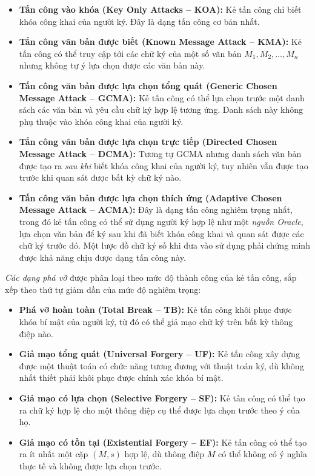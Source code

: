 \begin{itemize}
    \item \textbf{Tấn công vào khóa (Key Only Attacks -- KOA):} Kẻ tấn công chỉ biết khóa công khai của người ký. Đây là dạng tấn công cơ bản nhất.

    \item \textbf{Tấn công văn bản được biết (Known Message Attack -- KMA):} Kẻ tấn công có thể truy cập tới các chữ ký của một số văn bản $M_1, M_2, \dots, M_n$ nhưng không tự ý lựa chọn được các văn bản này.

    \item \textbf{Tấn công văn bản được lựa chọn tổng quát (Generic Chosen Message Attack -- GCMA):} Kẻ tấn công có thể lựa chọn trước một danh sách các văn bản và yêu cầu chữ ký hợp lệ tương ứng. Danh sách này không phụ thuộc vào khóa công khai của người ký.

    \item \textbf{Tấn công văn bản được lựa chọn trực tiếp (Directed Chosen Message Attack -- DCMA):} Tương tự GCMA nhưng danh sách văn bản được tạo ra \textit{sau khi} biết khóa công khai của người ký, tuy nhiên vẫn được tạo trước khi quan sát được bất kỳ chữ ký nào.

    \item \textbf{Tấn công văn bản được lựa chọn thích ứng (Adaptive Chosen Message Attack -- ACMA):} Đây là dạng tấn công nghiêm trọng nhất, trong đó kẻ tấn công có thể sử dụng người ký hợp lệ như một \textit{nguồn Oracle}, lựa chọn văn bản để ký sau khi đã biết khóa công khai và quan sát được các chữ ký trước đó. Một lược đồ chữ ký số khi đưa vào sử dụng phải chứng minh được khả năng chịu được dạng tấn công này.
\end{itemize}

\textit{Các dạng phá vỡ} được phân loại theo mức độ thành công của kẻ tấn công, sắp xếp theo thứ tự giảm dần của mức độ nghiêm trọng:

\begin{itemize}
    \item \textbf{Phá vỡ hoàn toàn (Total Break -- TB):} Kẻ tấn công khôi phục được khóa bí mật của người ký, từ đó có thể giả mạo chữ ký trên bất kỳ thông điệp nào.

    \item \textbf{Giả mạo tổng quát (Universal Forgery -- UF):} Kẻ tấn công xây dựng được một thuật toán có chức năng tương đương với thuật toán ký, dù không nhất thiết phải khôi phục được chính xác khóa bí mật.

    \item \textbf{Giả mạo có lựa chọn (Selective Forgery -- SF):} Kẻ tấn công có thể tạo ra chữ ký hợp lệ cho một thông điệp cụ thể được lựa chọn trước theo ý của họ.

    \item \textbf{Giả mạo có tồn tại (Existential Forgery -- EF):} Kẻ tấn công có thể tạo ra ít nhất một cặp $(M, s)$ hợp lệ, dù thông điệp $M$ có thể không có ý nghĩa thực tế và không được lựa chọn trước.
\end{itemize}

